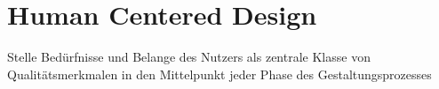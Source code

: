 \section{Human Centered Design}
Stelle Bedürfnisse und Belange des Nutzers als zentrale Klasse von Qualitätsmerkmalen in den Mittelpunkt jeder Phase des Gestaltungsprozesses




